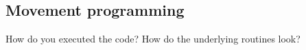 \subsection{Movement programming}
How do you executed the code? How do the underlying routines look?